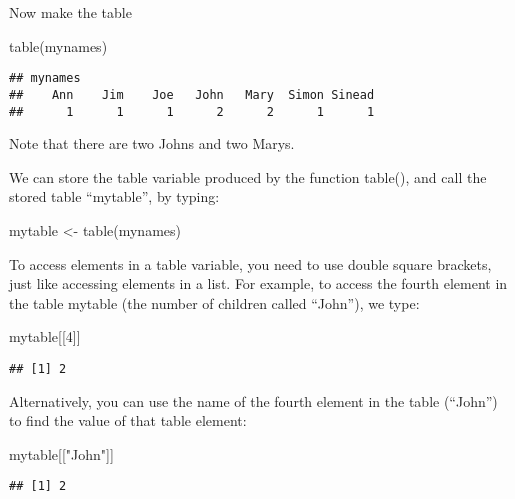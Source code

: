 \documentclass[
]{book}
\newenvironment{Shaded}{\begin{snugshade}}{\end{snugshade}}
\newcommand{\DecValTok}[1]{\textcolor[rgb]{0.00,0.00,0.81}{#1}}
\newcommand{\FunctionTok}[1]{\textcolor[rgb]{0.00,0.00,0.00}{#1}}
\newcommand{\NormalTok}[1]{#1}
\newcommand{\OtherTok}[1]{\textcolor[rgb]{0.56,0.35,0.01}{#1}}
\newcommand{\StringTok}[1]{\textcolor[rgb]{0.31,0.60,0.02}{#1}}
\begin{document}
Now make the table

\begin{Shaded}
\begin{Highlighting}[]
\FunctionTok{table}\NormalTok{(mynames)}
\end{Highlighting}
\end{Shaded}

\begin{verbatim}
## mynames
##    Ann    Jim    Joe   John   Mary  Simon Sinead 
##      1      1      1      2      2      1      1
\end{verbatim}

Note that there are two Johns and two Marys.

We can store the table variable produced by the function table(), and call the stored table ``mytable'', by typing:

\begin{Shaded}
\begin{Highlighting}[]
\NormalTok{mytable }\OtherTok{\textless{}{-}} \FunctionTok{table}\NormalTok{(mynames)}
\end{Highlighting}
\end{Shaded}

To access elements in a table variable, you need to use double square brackets, just like accessing elements in a list. For example, to access the fourth element in the table mytable (the number of children called ``John''), we type:

\begin{Shaded}
\begin{Highlighting}[]
\NormalTok{mytable[[}\DecValTok{4}\NormalTok{]]}
\end{Highlighting}
\end{Shaded}

\begin{verbatim}
## [1] 2
\end{verbatim}

Alternatively, you can use the name of the fourth element in the table (``John'') to find the value of that table element:

\begin{Shaded}
\begin{Highlighting}[]
\NormalTok{mytable[[}\StringTok{"John"}\NormalTok{]]}
\end{Highlighting}
\end{Shaded}

\begin{verbatim}
## [1] 2
\end{verbatim}
\end{document}
